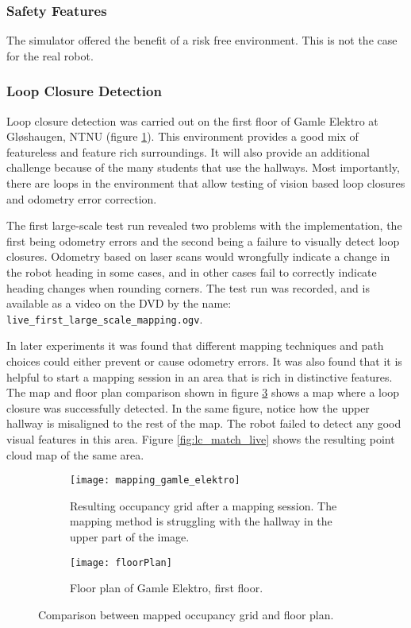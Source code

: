 \subsubsection{Safety Features}

The simulator offered the benefit of a risk free environment. This is not the case for the real robot. 

\subsubsection{Loop Closure Detection}

Loop closure detection was carried out on the first floor of Gamle Elektro at Gløshaugen, NTNU (figure \ref{fig:mapping_gamle_elektro}). This environment provides a good mix of featureless and feature rich surroundings. It will also provide an additional challenge because of the many students that use the hallways. Most importantly, there are loops in the environment that allow testing of vision based loop closures and odometry error correction. 

The first large-scale test run revealed two problems with the implementation, the first being odometry errors and the second being a failure to visually detect loop closures. Odometry based on laser scans would wrongfully indicate a change in the robot heading in some cases, and in other cases fail to correctly indicate heading changes when rounding corners. The test run was recorded, and is available as a video on the DVD by the name: \texttt{live\_first\_large\_scale\_mapping.ogv}.

In later experiments it was found that different mapping techniques and path choices could either prevent or cause odometry errors. It was also found that it is helpful to start a mapping session in an area that is rich in distinctive features. The map and floor plan comparison shown in figure \ref{fig:comparison} shows a map where a loop closure was successfully detected. In the same figure, notice how the upper hallway is misaligned to the rest of the map. The robot failed to detect any good visual features in this area. Figure \ref{fig:lc_match_live} shows the resulting point cloud map of the same area.

\begin{figure}
	\centering
	\begin{subfigure}[b]{1\textwidth}
		\texttt{[image: mapping\_gamle\_elektro]}
		\caption{Resulting occupancy grid after a mapping session. The mapping  method is struggling with the  hallway in the upper part of the image.}
		\label{fig:mapping_gamle_elektro}
	\end{subfigure}
	\begin{subfigure}[b]{1\textwidth}
		\texttt{[image: floorPlan]}
		\caption{Floor plan of Gamle Elektro, first floor.}
		\label{fig:floorPlan}
	\end{subfigure}
	\caption{Comparison between mapped occupancy grid and floor plan.}\label{fig:comparison}
\end{figure}



